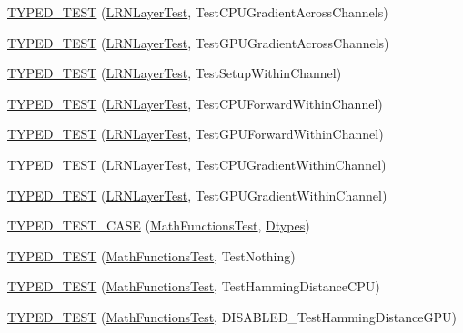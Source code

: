 \begin{DoxyCompactItemize}
\item 
\hyperlink{namespacecaffe_a22c9f77a61ebb22323bddd3877835915}{T\+Y\+P\+E\+D\+\_\+\+T\+E\+S\+T} (\hyperlink{classcaffe_1_1_l_r_n_layer_test}{L\+R\+N\+Layer\+Test}, Test\+C\+P\+U\+Gradient\+Across\+Channels)
\item 
\hyperlink{namespacecaffe_ac8f175aad9c0228ba69d13b521bfc885}{T\+Y\+P\+E\+D\+\_\+\+T\+E\+S\+T} (\hyperlink{classcaffe_1_1_l_r_n_layer_test}{L\+R\+N\+Layer\+Test}, Test\+G\+P\+U\+Gradient\+Across\+Channels)
\item 
\hyperlink{namespacecaffe_ac6bf812da262ccc65b94109c7ab069f0}{T\+Y\+P\+E\+D\+\_\+\+T\+E\+S\+T} (\hyperlink{classcaffe_1_1_l_r_n_layer_test}{L\+R\+N\+Layer\+Test}, Test\+Setup\+Within\+Channel)
\item 
\hyperlink{namespacecaffe_adae80e3849fc8af6e8b435105ec659e3}{T\+Y\+P\+E\+D\+\_\+\+T\+E\+S\+T} (\hyperlink{classcaffe_1_1_l_r_n_layer_test}{L\+R\+N\+Layer\+Test}, Test\+C\+P\+U\+Forward\+Within\+Channel)
\item 
\hyperlink{namespacecaffe_aa8f85abd8225bd3c2921ed7be8eef0b7}{T\+Y\+P\+E\+D\+\_\+\+T\+E\+S\+T} (\hyperlink{classcaffe_1_1_l_r_n_layer_test}{L\+R\+N\+Layer\+Test}, Test\+G\+P\+U\+Forward\+Within\+Channel)
\item 
\hyperlink{namespacecaffe_adedaa5ecf192b3ae9b8644f32cb40062}{T\+Y\+P\+E\+D\+\_\+\+T\+E\+S\+T} (\hyperlink{classcaffe_1_1_l_r_n_layer_test}{L\+R\+N\+Layer\+Test}, Test\+C\+P\+U\+Gradient\+Within\+Channel)
\item 
\hyperlink{namespacecaffe_a07478eb41420e6d6e4ff05833d68b118}{T\+Y\+P\+E\+D\+\_\+\+T\+E\+S\+T} (\hyperlink{classcaffe_1_1_l_r_n_layer_test}{L\+R\+N\+Layer\+Test}, Test\+G\+P\+U\+Gradient\+Within\+Channel)
\item 
\hyperlink{namespacecaffe_a338c8f9415085c6b570409a519f9a55b}{T\+Y\+P\+E\+D\+\_\+\+T\+E\+S\+T\+\_\+\+C\+A\+S\+E} (\hyperlink{classcaffe_1_1_math_functions_test}{Math\+Functions\+Test}, \hyperlink{namespacecaffe_a131dc2be50f2f10e18450da61cde6b57}{Dtypes})
\item 
\hyperlink{namespacecaffe_aef5c4e46f5b84196055b5ae39fd3e067}{T\+Y\+P\+E\+D\+\_\+\+T\+E\+S\+T} (\hyperlink{classcaffe_1_1_math_functions_test}{Math\+Functions\+Test}, Test\+Nothing)
\item 
\hyperlink{namespacecaffe_aa31d7283082402d4036394268ecfdafe}{T\+Y\+P\+E\+D\+\_\+\+T\+E\+S\+T} (\hyperlink{classcaffe_1_1_math_functions_test}{Math\+Functions\+Test}, Test\+Hamming\+Distance\+C\+P\+U)
\item 
\hyperlink{namespacecaffe_a504e199edd662cf6b38e6a8f52ed0297}{T\+Y\+P\+E\+D\+\_\+\+T\+E\+S\+T} (\hyperlink{classcaffe_1_1_math_functions_test}{Math\+Functions\+Test}, D\+I\+S\+A\+B\+L\+E\+D\+\_\+\+Test\+Hamming\+Distance\+G\+P\+U)

\end{DoxyCompactItemize}
